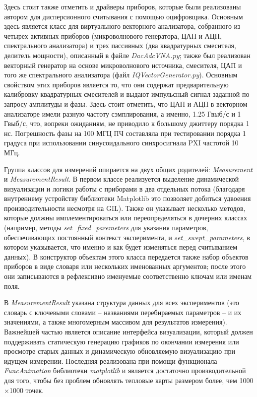 \documentclass[14pt, a4paper]{extreport}
\numberwithin{equation}{section}
\begin{document}
Здесь стоит также отметить и драйверы приборов, которые были реализованы автором для дисперсионного считывания с помощью оцифровщика. Основным здесь является класс для виртуального векторного анализатора, собранного из четырех активных приборов (микроволнового генератора, ЦАП и АЦП, спектрального анализатора) и трех пассивных (два квадратурных смесителя, делитель мощности), описанный в файле \foreignlanguage{english}{\textit{DacAdcVNA.py}}; также был реализован векторный генератор на основе микроволнового источника, смесителя, ЦАП и того же спектрального анализатора (файл \foreignlanguage{english}{\textit{IQVectorGenerator.py}}). Основным свойством этих приборов является то, что они содержат предварительную калибровку квадратурных смесителей и выдают импульсный сигнал заданной по запросу амплитуды и фазы. Здесь стоит отметить, что ЦАП и АЦП в векторном анализаторе имели разную частоту сэмплирования, а именно, 1.25 Гвыб/с и 1 Гвыб/с, что, вопреки ожиданиям, не приводило к большому джиттеру порядка 1 нс. Погрешность фазы на 100 МГЦ ПЧ составляла при тестировании порядка 1 градуса при использовании синусоидального синхросигнала PXI частотой 10 МГц.

Группа классов для измерений опирается на двух общих родителей: \foreignlanguage{english}{\textit{Measurement}} и \foreignlanguage{english}{\textit{MeasurementResult}}. В первом классе реализуется выделение динамической визуализации и логики работы с приборами в два отдельных потока (благодаря внутреннему устройству библиотеки Matplotlib это позволяет добиться удвоения производительности несмотря на GIL). Также он указывает несколько методов, которые должны имплементироваться или переопределяться в дочерних классах (например, методы \foreignlanguage{english}{\textit{set\_fixed\_paremeters}} для указания параметров, обеспечивающих постоянный контекст эксперимента, и \foreignlanguage{english}{\textit{set\_swept\_parameters}}, в котором указывается, что именно и как будет изменяться перед считыванием данных). В конструктор объектам этого класса передается также набор объектов приборов в виде словаря или нескольких именованных аргументов; после этого они записываются в рефлексивно именуемые соответственно ключам или именам поля.

В \textit{MeasurementResult} указана структура данных для всех экспериментов (это словарь с ключевыми словами -- названиями перебираемых параметров -- и их значениями, а также многомерным массивом для результатов измерения). Важнейшей частью является описание интерфейса визуализации, который должен поддерживать статическую генерацию графиков по окончании измерения или просмотре старых данных и динамическую обновляемую визуализацию при идущем измерении. Последняя реализована при помощи функционала \textit{FuncAnimation} библиотеки \textit{matplotlib} и является достаточно производительной для того, чтобы без проблем обновлять тепловые карты размером более, чем 1000$\times$1000 точек.
\end{document}
